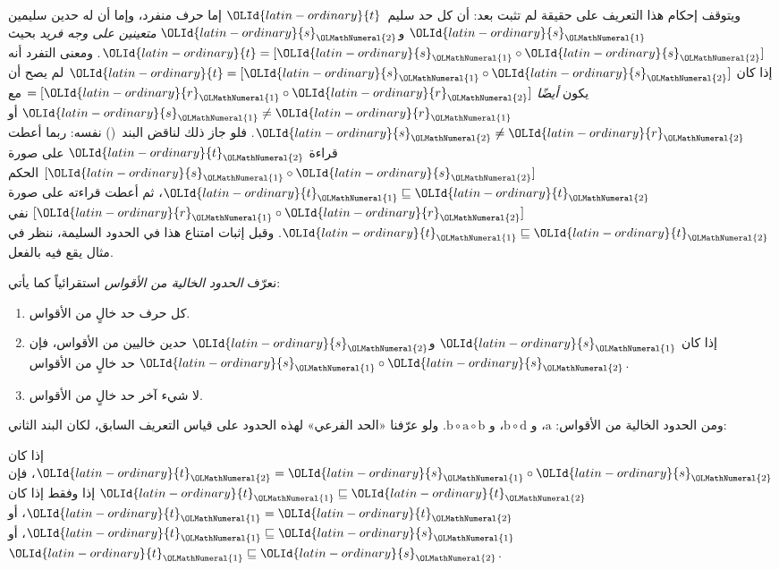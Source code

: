 \documentclass[../../../include/open-logic-section]{subfiles}
\begin{document}
ويتوقف إحكام هذا التعريف على حقيقة لم تثبت بعد: أن كل حد سليم~${\OLId{latin-ordinary}{t}}$
إما حرف منفرد، وإما أن له حدين سليمين ${\OLId{latin-ordinary}{s}}_{\OLMathNumeral{1}}$ و${\OLId{latin-ordinary}{s}}_{\OLMathNumeral{2}}$
\emph{متعينين على وجه فريد} بحيث ${\OLId{latin-ordinary}{t}} = [{\OLId{latin-ordinary}{s}}_{\OLMathNumeral{1}} \circ {\OLId{latin-ordinary}{s}}_{\OLMathNumeral{2}}]$. ومعنى التفرد
أنه إذا كان ${\OLId{latin-ordinary}{t}} = [{\OLId{latin-ordinary}{s}}_{\OLMathNumeral{1}} \circ {\OLId{latin-ordinary}{s}}_{\OLMathNumeral{2}}]$ لم يصح أن يكون \emph{أيضًا}
$= [{\OLId{latin-ordinary}{r}}_{\OLMathNumeral{1}} \circ {\OLId{latin-ordinary}{r}}_{\OLMathNumeral{2}}]$ مع ${\OLId{latin-ordinary}{s}}_{\OLMathNumeral{1}} \neq {\OLId{latin-ordinary}{r}}_{\OLMathNumeral{1}}$ أو ${\OLId{latin-ordinary}{s}}_{\OLMathNumeral{2}} \neq {\OLId{latin-ordinary}{r}}_{\OLMathNumeral{2}}$.
فلو جاز ذلك لناقض البند~() نفسه: ربما أعطت قراءة ${\OLId{latin-ordinary}{t}}_{\OLMathNumeral{2}}$ على صورة
$[{\OLId{latin-ordinary}{s}}_{\OLMathNumeral{1}} \circ {\OLId{latin-ordinary}{s}}_{\OLMathNumeral{2}}]$ الحكم ${\OLId{latin-ordinary}{t}}_{\OLMathNumeral{1}} \sqsubseteq {\OLId{latin-ordinary}{t}}_{\OLMathNumeral{2}}$، ثم أعطت قراءته على
صورة $[{\OLId{latin-ordinary}{r}}_{\OLMathNumeral{1}} \circ {\OLId{latin-ordinary}{r}}_{\OLMathNumeral{2}}]$ نفي ${\OLId{latin-ordinary}{t}}_{\OLMathNumeral{1}} \sqsubseteq {\OLId{latin-ordinary}{t}}_{\OLMathNumeral{2}}$. وقبل إثبات امتناع
هذا في الحدود السليمة، ننظر في مثال يقع فيه بالفعل.

\begin{defn}
  نعرّف \emph{الحدود الخالية من الأقواس} استقرائياً كما يأتي:
  \begin{enumerate}
  \item كل حرف حد خالٍ من الأقواس.
  \item إذا كان ${\OLId{latin-ordinary}{s}}_{\OLMathNumeral{1}}$ و${\OLId{latin-ordinary}{s}}_{\OLMathNumeral{2}}$ حدين خاليين من الأقواس، فإن
    ${\OLId{latin-ordinary}{s}}_{\OLMathNumeral{1}} \circ {\OLId{latin-ordinary}{s}}_{\OLMathNumeral{2}}$ حد خالٍ من الأقواس.
  \item لا شيء آخر حد خالٍ من الأقواس.
  \end{enumerate}
\end{defn}

ومن الحدود الخالية من الأقواس: $\mathrm{a}$، و
$\mathrm{b} \circ \mathrm{d}$، و
$\mathrm{b} \circ \mathrm{a} \circ \mathrm{b}$. ولو عرّفنا «الحد
الفرعي» لهذه الحدود على قياس التعريف السابق، لكان البند الثاني:
\begin{center}
  إذا كان ${\OLId{latin-ordinary}{t}}_{\OLMathNumeral{2}} = {\OLId{latin-ordinary}{s}}_{\OLMathNumeral{1}} \circ {\OLId{latin-ordinary}{s}}_{\OLMathNumeral{2}}$، فإن ${\OLId{latin-ordinary}{t}}_{\OLMathNumeral{1}} \sqsubseteq {\OLId{latin-ordinary}{t}}_{\OLMathNumeral{2}}$ إذا وفقط إذا
  كان ${\OLId{latin-ordinary}{t}}_{\OLMathNumeral{1}} = {\OLId{latin-ordinary}{t}}_{\OLMathNumeral{2}}$، أو ${\OLId{latin-ordinary}{t}}_{\OLMathNumeral{1}} \sqsubseteq {\OLId{latin-ordinary}{s}}_{\OLMathNumeral{1}}$، أو
  ${\OLId{latin-ordinary}{t}}_{\OLMathNumeral{1}} \sqsubseteq {\OLId{latin-ordinary}{s}}_{\OLMathNumeral{2}}$.
\end{center}
\end{document}
